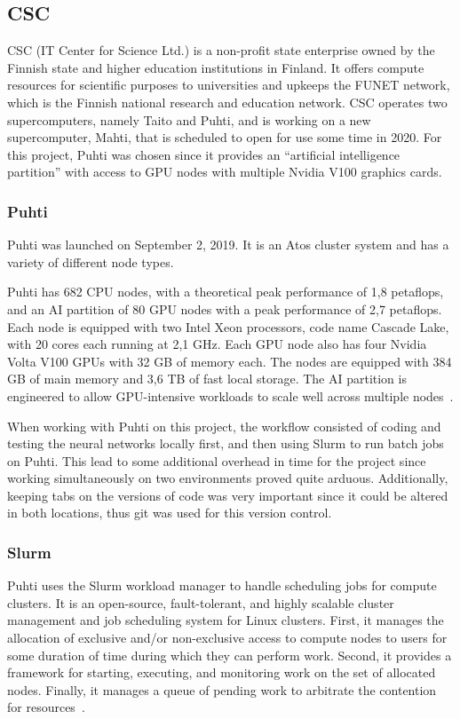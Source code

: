 \subsection{CSC} \label{CSC}
CSC (IT Center for Science Ltd.) is a non-profit state enterprise owned by the Finnish state and higher education institutions in Finland.
It offers compute resources for scientific purposes to universities and upkeeps the FUNET network, which is the Finnish national research and education network.
CSC operates two supercomputers, namely Taito and Puhti, and is working on a new supercomputer, Mahti, that is scheduled to open for use some time in 2020.
For this project, Puhti was chosen since it provides an ``artificial intelligence partition'' with access to GPU nodes with multiple Nvidia V100 graphics cards.

\subsubsection{Puhti}\label{Puhti}
Puhti was launched on September 2, 2019.
It is an Atos cluster system and has a variety of different node types.

Puhti has 682 CPU nodes, with a theoretical peak performance of 1,8 petaflops, and an AI partition of 80 GPU nodes with a peak performance of 2,7 petaflops.
Each node is equipped with two Intel Xeon processors, code name Cascade Lake, with 20 cores each running at 2,1 GHz.
Each GPU node also has four Nvidia Volta V100 GPUs with 32 GB of memory each.
The nodes are equipped with 384 GB of main memory and 3,6 TB of fast local storage.
The AI partition is engineered to allow GPU-intensive workloads to scale well across multiple nodes~\cite{zotero-178}.

When working with Puhti on this project, the workflow consisted of coding and testing the neural networks locally first, and then using Slurm to run batch jobs on Puhti.
This lead to some additional overhead in time for the project since working simultaneously on two environments proved quite arduous.
Additionally, keeping tabs on the versions of code was very important since it could be altered in both locations, thus git \cite{zotero-186} was used for this version control.

\subsubsection{Slurm}\label{Slurm}
Puhti uses the Slurm workload manager \cite{zotero-174} to handle scheduling jobs for compute clusters.
It is an open-source, fault-tolerant, and highly scalable cluster management and job scheduling system for Linux clusters.
First, it manages the allocation of exclusive and/or non-exclusive access to compute nodes to users for some duration of time during which they can perform work.
Second, it provides a framework for starting, executing, and monitoring work on the set of allocated nodes.
Finally, it manages a queue of pending work to arbitrate the contention for resources~\cite{zotero-176}.


